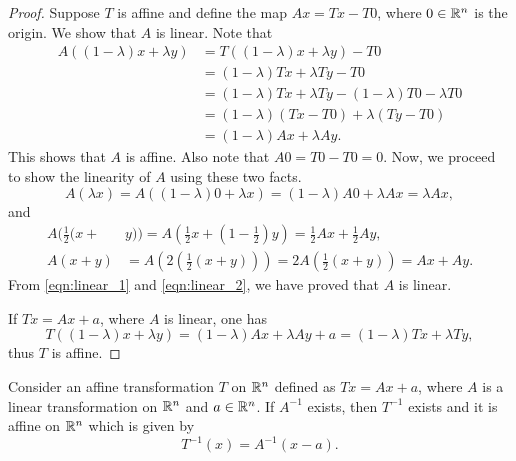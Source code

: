 \documentclass[11pt,a4paper]{article}
\begin{document}
\begin{proof}
    \forward Suppose $T$ is affine and define the map $Ax = Tx - T0$, where $0\in\mathbb{R}^n$ is the origin. We show that $A$ is linear. Note that
    \begin{align*}
        A((1-\lambda)x + \lambda y) &= T((1-\lambda)x + \lambda y) - T0 \\
        &= (1-\lambda) Tx + \lambda Ty - T0 \\
        &= (1-\lambda) Tx + \lambda Ty - (1-\lambda)T0 - \lambda T0 \\
        &= (1-\lambda) (Tx-T0) + \lambda (Ty-T0) \\
        &= (1-\lambda) Ax + \lambda Ay.
    \end{align*}
    This shows that $A$ is affine. Also note that $A0 = T0 - T0 = 0$. Now, we proceed to show the linearity of $A$ using these two facts.
    \begin{equation}\label{eqn:linear_1}
        A(\lambda x) = A((1-\lambda)0 + \lambda x) = (1-\lambda)A0 + \lambda Ax = \lambda Ax,
    \end{equation} 
    and
    \begin{align}\label{eqn:linear_2}
        A(\tfrac{1}{2}(x+&y)) = A(\tfrac{1}{2}x + (1-\tfrac{1}{2})y) = \tfrac{1}{2}Ax + \tfrac{1}{2}Ay,\nonumber \\
        A(x+y) &= A(2(\tfrac{1}{2}(x+y))) = 2 A(\tfrac{1}{2}(x+y)) = Ax + Ay.
    \end{align}
    From \eqref{eqn:linear_1} and \eqref{eqn:linear_2}, we have proved that $A$ is linear.

    \noindent\converse If $Tx = Ax+a$, where $A$ is linear, one has
    \begin{equation*}
        T((1-\lambda)x+\lambda y) = (1-\lambda)Ax + \lambda Ay + a = (1-\lambda) Tx + \lambda Ty,
    \end{equation*}
    thus $T$ is affine.
\end{proof}

\begin{proposition}
    Consider an affine transformation $T$ on $\mathbb{R}^n$ defined as $Tx = Ax+a$, where $A$ is a linear transformation on $\mathbb{R}^n$ and $a\in\mathbb{R}^n$. If $A^{-1}$ exists, then $T^{-1}$ exists and it is affine on $\mathbb{R}^n$ which is given by
    \begin{equation*}
        T^{-1}(x) = A^{-1}(x-a).
    \end{equation*}
\end{proposition}
\end{document}
